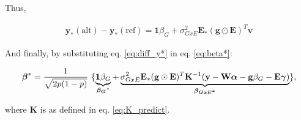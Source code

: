

Thus,

\begin{align}\label{eq:diff_y*}
    \mathbf{y}_*(\mathrm{alt}) - \mathbf{y}_*(\mathrm{ref}) = \mathbf{1}\beta_G + \sigma_{GxE}^2\mathbf{E}_*(\mathbf{g}\odot\mathbf{E})^T \mathbf{v}
\end{align}

And finally, by substituting eq. \eqref{eq:diff_y*} in eq. \eqref{eq:beta*}:

\begin{align}
    \bfbeta^* = \frac{1}{\sqrt{2p(1-p)}} \ \{\underbrace{\mathbf{1}\beta_G}_{\boldsymbol{\beta_G}^*} + \underbrace{\sigma_{GxE}^2\mathbf{E}_*(\mathbf{g}\odot\mathbf{E})^T \mathbf{K}^{-1}(\mathbf{y}-\mathbf{W}\bfalpha - \bfg \beta_G - \mathbf{E} \boldsymbol{\gamma})}_{\boldsymbol{\beta_{GxE^*}}}\},
\end{align}

where $\mathbf{K}$ is as defined in eq. \eqref{eq:K_predict}.


\newpage





